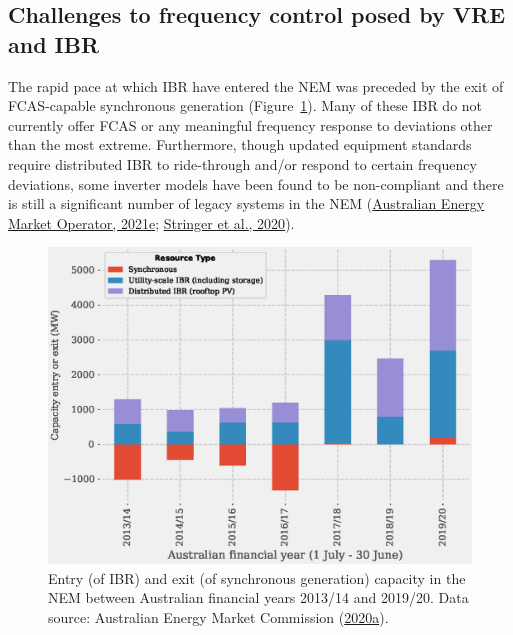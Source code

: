 \documentclass[12pt,a4paper,]{report}
\begin{document}
\hypertarget{challenges-to-frequency-control-posed-by-vre-and-ibr}{%
\subsection{Challenges to frequency control posed by VRE and
IBR}\label{challenges-to-frequency-control-posed-by-vre-and-ibr}}

The rapid pace at which IBR have entered the NEM was preceded by the
exit of FCAS-capable synchronous generation
(Figure~\ref{fig:entry_exit}). Many of these IBR do not currently offer
FCAS or any meaningful frequency response to deviations other than the
most extreme. Furthermore, though updated equipment standards require
distributed IBR to ride-through and/or respond to certain frequency
deviations, some inverter models have been found to be non-compliant and
there is still a significant number of legacy systems in the NEM
(\protect\hyperlink{ref-australianenergymarketoperatorBehaviourDistributedResources2021}{Australian
Energy Market Operator, 2021e};
\protect\hyperlink{ref-stringerConsumerLedTransitionAustralia2020}{Stringer
et al., 2020}).

\begin{figure}
\hypertarget{fig:entry_exit}{%
\centering
\includegraphics{source/figures/synchronous_ibr_entry_exit.eps}
\caption[Entry and exit of generation capacity in the NEM between
2013/14 and 2019/20]{Entry (of IBR) and exit (of synchronous generation)
capacity in the NEM between Australian financial years 2013/14 and
2019/20. Data source: Australian Energy Market Commission
(\protect\hyperlink{ref-australianenergymarketcommissionAnnualMarketPerformance2020}{2020a}).}\label{fig:entry_exit}
}
\end{figure}
\end{document}

